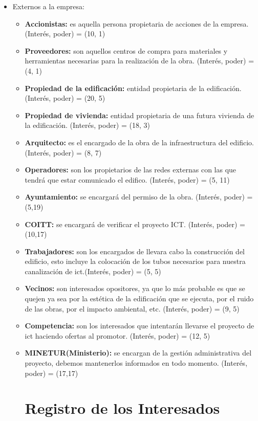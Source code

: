 \begin{itemize}
    \item Externos a la empresa:

\begin{itemize}
    
  
    \item \textbf{Accionistas: } es aquella persona propietaria de acciones de la empresa. (Interés, poder) = (10, 1)
    \item \textbf{Proveedores: } son aquellos centros de compra para materiales y herramientas necesarias para la realización de la obra. (Interés, poder) = (4, 1)
    \item \textbf{Propiedad de la edificación: } entidad propietaria de la edificación. (Interés, poder) = (20, 5)
    \item \textbf{Propiedad de vivienda: } entidad propietaria de una futura vivienda de la edificación. (Interés, poder) = (18, 3)
    \item \textbf{Arquitecto: }es el encargado de la obra de la infraestructura del edificio. (Interés, poder) = (8, 7)
    \item \textbf{Operadores: }son los propietarios de las redes externas con las que tendrá que estar comunicado el edifico. (Interés, poder) = (5, 11)
    \item \textbf{Ayuntamiento: } se encargará del permiso de la obra. (Interés, poder) = (5,19)
    \item \textbf{COITT: } se encargará de verificar el proyecto ICT. (Interés, poder) = (10,17)
    \item \textbf{Trabajadores: }son los encargados de llevara cabo la construcción del edificio, esto incluye la colocación de los tubos necesarios para nuestra canalización de ict.(Interés, poder) = (5, 5)
    \item \textbf{Vecinos: }son interesados opositores, ya que lo más probable es que se quejen ya sea por la estética de la edificación que se ejecuta, por el ruido de las obras, por el impacto ambiental, etc. (Interés, poder) = (9, 5)
    \item \textbf{Competencia: }son los interesados que intentarán llevarse el proyecto de ict haciendo ofertas al promotor. (Interés, poder) = (12, 5)
    \item \textbf{MINETUR(Ministerio): }se encargan de la gestión administrativa del proyecto, debemos mantenerlos informados en todo momento. (Interés, poder) = (17,17)
    \section{Registro de los Interesados}
    \end{itemize}
\end{itemize}
